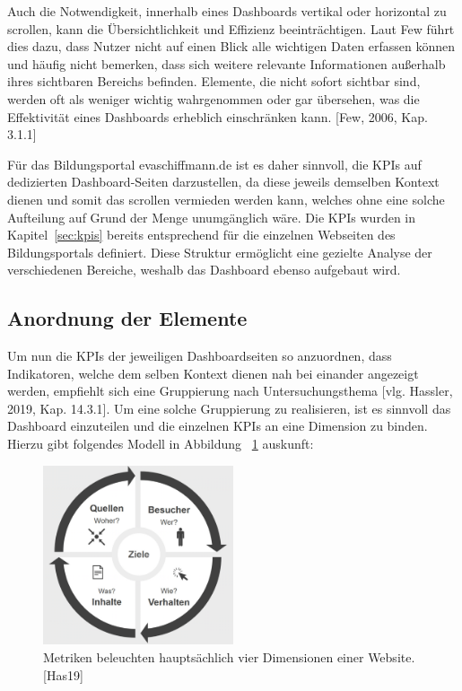 Auch die Notwendigkeit, innerhalb eines Dashboards vertikal oder horizontal zu scrollen, kann die Übersichtlichkeit und Effizienz beeinträchtigen. Laut Few führt dies dazu, dass Nutzer nicht auf einen Blick alle wichtigen Daten erfassen können und häufig nicht bemerken, dass sich weitere relevante Informationen außerhalb ihres sichtbaren Bereichs befinden. Elemente, die nicht sofort sichtbar sind, werden oft als weniger wichtig wahrgenommen oder gar übersehen, was die Effektivität eines Dashboards erheblich einschränken kann. [Few, 2006, Kap. 3.1.1]

Für das Bildungsportal evaschiffmann.de ist es daher sinnvoll, die KPIs auf dedizierten Dashboard-Seiten darzustellen, da diese jeweils demselben Kontext dienen und somit das scrollen vermieden werden kann, welches ohne eine solche Aufteilung auf Grund der Menge unumgänglich wäre. Die KPIs wurden in Kapitel~\ref{sec:kpis} bereits entsprechend für die einzelnen Webseiten des Bildungsportals definiert. Diese Struktur ermöglicht eine gezielte Analyse der verschiedenen Bereiche, weshalb das Dashboard ebenso aufgebaut wird.

\subsection{Anordnung der Elemente}
Um nun die KPIs der jeweiligen Dashboardseiten so anzuordnen, dass Indikatoren, welche dem selben Kontext dienen nah bei einander angezeigt werden, empfiehlt sich eine Gruppierung nach Untersuchungsthema [vlg. Hassler, 2019, Kap. 14.3.1]. Um eine solche Gruppierung zu realisieren, ist es sinnvoll das Dashboard einzuteilen und die einzelnen KPIs an eine Dimension zu binden. Hierzu gibt folgendes Modell in Abbildung ~\ref{fig:dimensionen} auskunft: 

\begin{figure}[h]
    \centering
    \includegraphics[width=0.5\textwidth]{images/dimensionen.png}%
    \caption{Metriken beleuchten hauptsächlich vier Dimensionen einer Website. [Has19]}%
    \label{fig:dimensionen}%
\end{figure}

